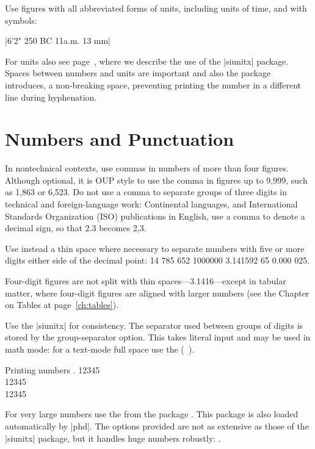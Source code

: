 Use figures with all abbreviated forms of units, including units of time,
and with symbols:


|6'2" 250 BC 11a.m. 13 mm|

For units also see page~\pageref{units}, where we describe the use of the |siunitx| package. Spaces between numbers and units are important and also the package introduces, a non-breaking space, preventing printing the number in a different line during hyphenation.

\section{Numbers and Punctuation}

In nontechnical contexts, use commas in numbers of more than four
figures. Although optional, it is OUP style to use the comma in figures up
to 9,999, such as 1,863 or 6,523. Do not use a comma to separate groups of
three digits in technical and foreign-language work:
Continental languages,
and International Standards Organization (ISO) publications in
English, use a comma to denote a decimal sign, so that 2.3 becomes 2,3.

Use instead a thin space where necessary to separate numbers with five
or more digits either side of the decimal point:
14 785 652 1000000 3.141592 65 0.000 025.

Four-digit figures are not split with thin spaces—3.1416—except in
tabular matter, where four-digit figures are aligned with larger numbers (see the Chapter on Tables at page~\ref{ch:tables}).

Use the |siunitx| for consistency. The separator used between groups of digits is stored by the group-separator option.
This takes literal input and may be used in math mode: for a text-mode full space use the (\texttt{~}).

\begin{texexample}{Printing numbers}{}
\text{~}.
\num{12345} \\
\num[group-separator = {,}]{12345} \\
\num[group-separator = \text{~}]{12345}
\end{texexample}

For very large numbers use the \cmd{\numprint} from the  package \citep{numprint}. This package is also loaded automatically by |phd|. The options provided are not as extensive as those of the |siunitx| package, but it handles huge numbers robustly: . 

